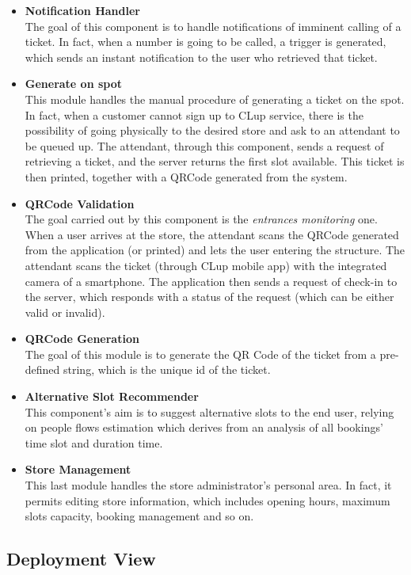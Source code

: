 \documentclass[table, 12pt]{article}
\begin{document}
\begin{itemize}
    \item \textbf{Notification Handler}\\The goal of this component is to handle notifications of imminent calling of a ticket. In fact, when a number is going to be called, a trigger is generated, which sends an instant notification to the user who retrieved that ticket.
    \item \textbf{Generate on spot}\\This module handles the manual procedure of generating a ticket on the spot. In fact, when a customer cannot sign up to CLup service, there is the possibility of going physically to the desired store and ask to an attendant to be queued up. The attendant, through this component, sends a request of retrieving a ticket, and the server returns the first slot available. This ticket is then printed, together with a QRCode generated from the system.
    \item \textbf{QRCode Validation}\\The goal carried out by this component is the \textit{entrances monitoring} one. When a user arrives at the store, the attendant scans the QRCode generated from the application (or printed) and lets the user entering the structure. The attendant scans the ticket (through CLup mobile app) with the integrated camera of a smartphone. The application then sends a request of check-in to the server, which responds with a status of the request (which can be either valid or invalid).
    \item \textbf{QRCode Generation}\\The goal of this module is to generate the QR Code of the ticket from a pre-defined string, which is the unique id of the ticket.
    \item \textbf{Alternative Slot Recommender}\\This component's aim is to suggest alternative slots to the end user, relying on people flows estimation which derives from an analysis of all bookings' time slot and duration time.
    \item \textbf{Store Management}\\This last module handles the store administrator's personal area. In fact, it permits editing store information, which includes opening hours, maximum slots capacity, booking management and so on.
\end{itemize}

\subsection{Deployment View}
\end{document}
